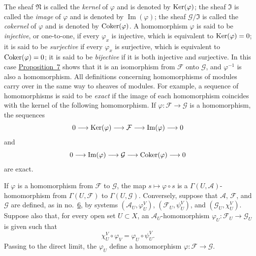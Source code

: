 The sheaf $\mathfrak{N}$ is called the \textit{kernel} of $\varphi$ and is denoted by $\operatorname{Ker}(\varphi)$; the sheaf $\mathfrak{I}$ is called the \textit{image} of $\varphi$ and is denoted by $\operatorname{Im}(\varphi)$; the sheaf $\mathcal{G}/\mathfrak{I}$ is called the \textit{cokernel} of $\varphi$ and is denoted by $\operatorname{Coker}(\varphi)$. A homomorphism $\varphi$ is said to be \textit{injective}, or one-to-one, if every $\varphi_x$ is injective, which is equivalent to $\operatorname{Ker}(\varphi)=0$; it is said to be \textit{surjective} if every $\varphi_x$ is surjective, which is equivalent to $\operatorname{Coker}(\varphi)=0$; it is said to be \textit{bijective} if it is both injective and surjective. In this case \hyperref[fac:I:1:no:8:prop:7]{Proposition~7} shows that it is an isomorphism from $\mathcal{F}$ onto $\mathcal{G}$, and $\varphi^{-1}$ is also a homomorphism. All definitions concerning homomorphisms of modules carry over in the same way to sheaves of modules. For example, a sequence of homomorphisms is said to be \textit{exact} if the image of each homomorphism coincides with the kernel of the following homomorphism. If $\varphi:\mathcal{F}\to\mathcal{G}$ is a homomorphism, the sequences
\[
0\longrightarrow\operatorname{Ker}(\varphi)\longrightarrow\mathcal{F}
\longrightarrow\operatorname{Im}(\varphi)\longrightarrow 0
\]
and
\[
0\longrightarrow\operatorname{Im}(\varphi)\longrightarrow\mathcal{G}
\longrightarrow\operatorname{Coker}(\varphi)\longrightarrow 0
\]
are exact.

If $\varphi$ is a homomorphism from $\mathcal{F}$ to $\mathcal{G}$, the map $s\mapsto\varphi\circ s$ is a $\Gamma(U,\mathcal{A})$-homomorphism from $\Gamma(U,\mathcal{F})$ to $\Gamma(U,\mathcal{G})$. Conversely, suppose that $\mathcal{A}$, $\mathcal{F}$, and $\mathcal{G}$ are defined, as in no.~\hyperref[fac:I:1:no:6]{6}, by systems $(\mathcal{A}_U,\varphi_U^V)$, $(\mathcal{F}_U,\psi_U^V)$, and $(\mathcal{G}_U,\chi_U^V)$. Suppose also that, for every open set $U\subset X$, an $\mathcal{A}_U$-homomorphism $\varphi_U:\mathcal{F}_U\to\mathcal{G}_U$ is given such that
\[
\chi_U^V\circ\varphi_V=\varphi_U\circ\psi_U^V.
\]
Passing to the direct limit, the $\varphi_U$ define a homomorphism $\varphi:\mathcal{F}\to\mathcal{G}$.
